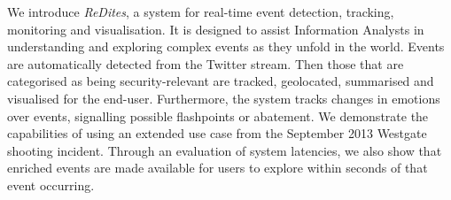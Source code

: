 We introduce {\em ReDites}, a system for real-time event detection, tracking, monitoring and visualisation.  It is designed to assist Information Analysts in understanding and exploring complex events as they unfold in the world.  Events are automatically detected from the Twitter stream. Then those that are categorised as being security-relevant are tracked, geolocated, summarised and visualised for the end-user. Furthermore, the system tracks changes in emotions over events, signalling possible flashpoints or abatement. We demonstrate the capabilities of \acronym{\textasciitilde} using an extended use case from the September 2013 Westgate shooting incident. Through an evaluation of system latencies, we also show that enriched events are made available for users to explore within seconds of that event occurring.
